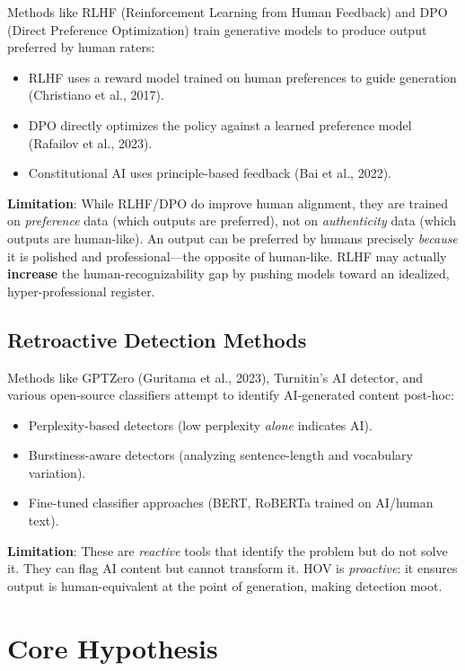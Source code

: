 \documentclass[12pt,oneside]{article}
\begin{document}
Methods like RLHF (Reinforcement Learning from Human Feedback) and DPO (Direct Preference Optimization) train generative models to produce output preferred by human raters:
\begin{itemize}[noitemsep]
    \item RLHF uses a reward model trained on human preferences to guide generation (Christiano et al., 2017).
    \item DPO directly optimizes the policy against a learned preference model (Rafailov et al., 2023).
    \item Constitutional AI uses principle-based feedback (Bai et al., 2022).
\end{itemize}

\textbf{Limitation}: While RLHF/DPO do improve human alignment, they are trained on \textit{preference} data (which outputs are preferred), not on \textit{authenticity} data (which outputs are human-like). An output can be preferred by humans precisely \textit{because} it is polished and professional---the opposite of human-like. RLHF may actually \textbf{increase} the human-recognizability gap by pushing models toward an idealized, hyper-professional register.

\subsection{Retroactive Detection Methods}

Methods like GPTZero (Guritama et al., 2023), Turnitin's AI detector, and various open-source classifiers attempt to identify AI-generated content post-hoc:
\begin{itemize}[noitemsep]
    \item Perplexity-based detectors (low perplexity \textit{alone} indicates AI).
    \item Burstiness-aware detectors (analyzing sentence-length and vocabulary variation).
    \item Fine-tuned classifier approaches (BERT, RoBERTa trained on AI/human text).
\end{itemize}

\textbf{Limitation}: These are \textit{reactive} tools that identify the problem but do not solve it. They can flag AI content but cannot transform it. HOV is \textit{proactive}: it ensures output is human-equivalent at the point of generation, making detection moot.

\section{Core Hypothesis}
\end{document}
